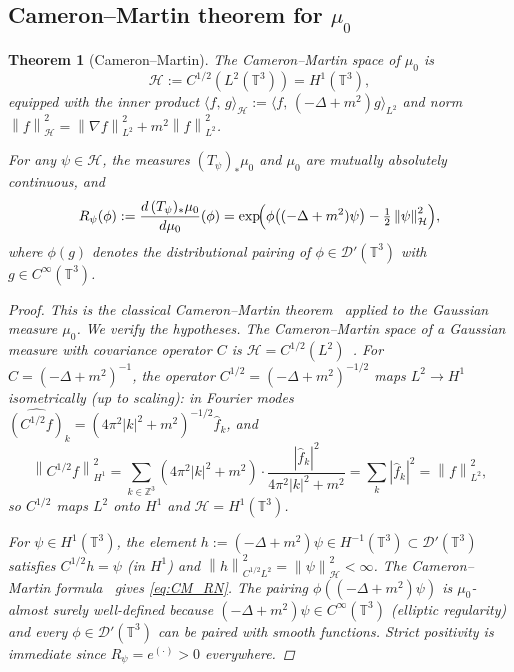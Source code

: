 \documentclass[11pt,a4paper]{article}
\newtheorem{theorem}{Theorem}[section]
\theoremstyle{definition}
\newcommand{\T}{\mathbb{T}}
\newcommand{\Dc}{\mathcal{D}}
\newcommand{\Hc}{\mathcal{H}}
\newcommand{\norm}[1]{\left\|#1\right\|}
\newcommand{\ip}[2]{\langle #1,\, #2 \rangle}
\begin{document}
\subsection{Cameron--Martin theorem for $\mu_0$}

\begin{theorem}[Cameron--Martin]\label{thm:CM}
The Cameron--Martin space of $\mu_0$ is
\[
\Hc := C^{1/2}(L^2(\T^3)) = H^1(\T^3),
\]
equipped with the inner product $\ip{f}{g}_\Hc := \ip{f}{(-\Delta+m^2)g}_{L^2}$ and norm $\norm{f}_\Hc^2 = \norm{\nabla f}_{L^2}^2 + m^2\norm{f}_{L^2}^2$.

For any $\psi\in\Hc$, the measures $(T_\psi)_*\mu_0$ and $\mu_0$ are mutually absolutely continuous, and
\begin{equation}\label{eq:CM_RN}
R_\psi(\phi) :=\frac{d\,(T_\psi)_*\mu_0}{d\mu_0}(\phi)
= \exp\!\Bigl(\phi\bigl((-\Delta+m^2)\psi\bigr) - \tfrac{1}{2}\norm{\psi}_\Hc^2\Bigr),
\end{equation}
where $\phi(g)$ denotes the distributional pairing of $\phi\in\Dc'(\T^3)$ with $g\in C^\infty(\T^3)$.

\begin{proof}
This is the classical Cameron--Martin theorem~\cite[Theorem~2.4.3]{Bogachev1998} applied to the Gaussian measure $\mu_0$.
We verify the hypotheses.
The Cameron--Martin space of a Gaussian measure with covariance operator $C$ is $\mathcal{H}=C^{1/2}(L^2)$~\cite[Chapter~2]{Bogachev1998}.
For $C=(-\Delta+m^2)^{-1}$, the operator $C^{1/2}=(-\Delta+m^2)^{-1/2}$ maps $L^2\to H^1$ isometrically (up to scaling): in Fourier modes $\widehat{(C^{1/2}f)}_k = (4\pi^2|k|^2+m^2)^{-1/2}\hat{f}_k$, and
\[
\norm{C^{1/2}f}_{H^1}^2
= \sum_{k\in\mathbb{Z}^3}(4\pi^2|k|^2+m^2)\cdot\frac{|\hat{f}_k|^2}{4\pi^2|k|^2+m^2}
= \sum_k|\hat{f}_k|^2 = \norm{f}_{L^2}^2,
\]
so $C^{1/2}$ maps $L^2$ onto $H^1$ and $\Hc = H^1(\T^3)$.

For $\psi\in H^1(\T^3)$, the element $h := (-\Delta+m^2)\psi\in H^{-1}(\T^3)\subset\Dc'(\T^3)$ satisfies $C^{1/2}h = \psi$ (in $H^1$) and $\norm{h}_{C^{1/2}L^2}^2 = \norm{\psi}_\Hc^2 < \infty$.
The Cameron--Martin formula~\cite[eq.\,(2.4.4)]{Bogachev1998} gives \eqref{eq:CM_RN}.
The pairing $\phi((-\Delta+m^2)\psi)$ is $\mu_0$-almost surely well-defined because $(-\Delta+m^2)\psi\in C^\infty(\T^3)$ (elliptic regularity) and every $\phi\in\Dc'(\T^3)$ can be paired with smooth functions.
Strict positivity is immediate since $R_\psi = e^{(\cdot)} > 0$ everywhere.
\end{proof}
\end{theorem}
\end{document}
